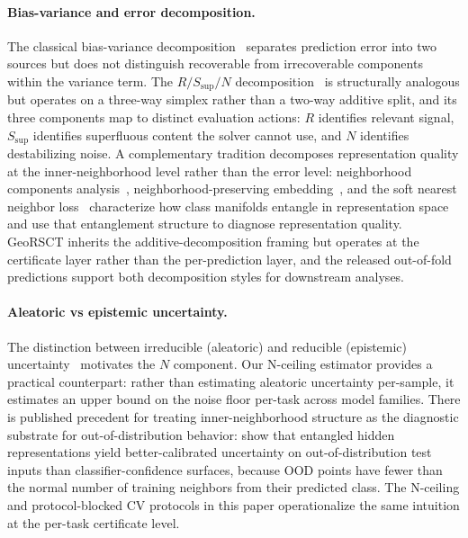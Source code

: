 \documentclass{article}
\begin{document}
\paragraph{Bias-variance and error decomposition.} The classical bias-variance decomposition~\citep{geman1992neural} separates prediction error into two sources but does not distinguish recoverable from irrecoverable components within the variance term. The $R/S_{\text{sup}}/N$ decomposition~\citep{martin2026rsct} is structurally analogous but operates on a three-way simplex rather than a two-way additive split, and its three components map to distinct evaluation actions: $R$ identifies relevant signal, $S_{\text{sup}}$ identifies superfluous content the solver cannot use, and $N$ identifies destabilizing noise. A complementary tradition decomposes representation quality at the inner-neighborhood level rather than the error level: neighborhood components analysis~\citep{goldberger2005neighbourhood}, neighborhood-preserving embedding~\citep{salakhutdinov2007learning}, and the soft nearest neighbor loss~\citep{frosst2019analyzing} characterize how class manifolds entangle in representation space and use that entanglement structure to diagnose representation quality. GeoRSCT inherits the additive-decomposition framing but operates at the certificate layer rather than the per-prediction layer, and the released out-of-fold predictions support both decomposition styles for downstream analyses.

\paragraph{Aleatoric vs epistemic uncertainty.} The distinction between irreducible (aleatoric) and reducible (epistemic) uncertainty~\citep{kendall2017uncertainties,der2009aleatory} motivates the $N$ component. Our N-ceiling estimator provides a practical counterpart: rather than estimating aleatoric uncertainty per-sample, it estimates an upper bound on the noise floor per-task across model families. There is published precedent for treating inner-neighborhood structure as the diagnostic substrate for out-of-distribution behavior: \citet{frosst2019analyzing} show that entangled hidden representations yield better-calibrated uncertainty on out-of-distribution test inputs than classifier-confidence surfaces, because OOD points have fewer than the normal number of training neighbors from their predicted class. The N-ceiling and protocol-blocked CV protocols in this paper operationalize the same intuition at the per-task certificate level.
\end{document}
